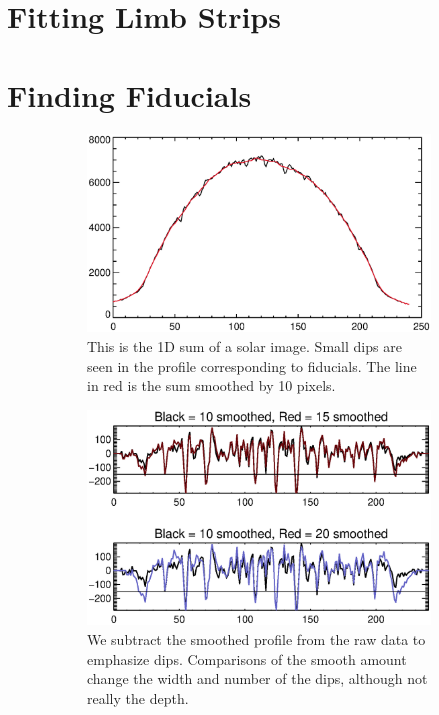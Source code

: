 \documentclass[10pt]{scrartcl}
\begin{document}

\section{Fitting Limb Strips} %
\label{sec:fitting_limb_strips}


\section{Finding Fiducials} %
\label{sec:finding_fiducials}

\begin{figure}[!ht]
    \begin{subfigure}[b]{.5\linewidth}
        \centering
        \includegraphics[width=\linewidth]{../plots_tables_images/smooth_expl.eps}
        \caption{This is the 1D sum of a solar image. Small dips are seen in the profile corresponding to fiducials. The line in red is the sum smoothed by 10 pixels.}
    \end{subfigure}
    \begin{subfigure}[b]{.5\linewidth}
        \centering
        \includegraphics[width=\linewidth]{../plots_tables_images/smoothcomp.eps}
        \caption{We subtract the smoothed profile from the raw data to emphasize dips. Comparisons of the smooth amount change the width and number of the dips, although not really the depth.}
        \label{threshed}
    \end{subfigure}
    \caption{}
    \label{smoothed}
\end{figure}
\end{document}
